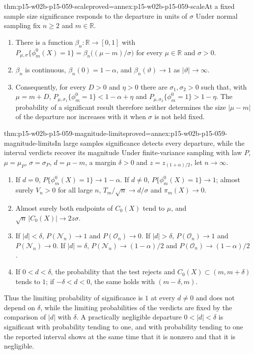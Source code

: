 \begin{hbtheorem}{thm:p15-w02b-p15-059-scale}{proved=annex:p15-w02b-p15-059-scale}{At a fixed sample size significance responds to the departure in units of \(\sigma\)}
Under normal sampling fix \(n\geq2\) and \(m\in\mathbb R\).
\begin{enumerate}
\item There is a function \(\beta_n:\mathbb R\to[0,1]\) with
\(P_{\mu,\sigma}\{\phi_m^0(X)=1\}=\beta_n\bigl((\mu-m)/\sigma\bigr)\) for
every \(\mu\in\mathbb R\) and \(\sigma>0\).
\item \(\beta_n\) is continuous, \(\beta_n(0)=1-\alpha\), and
\(\beta_n(\vartheta)\to1\) as \(|\vartheta|\to\infty\).
\item Consequently, for every \(D>0\) and \(\eta>0\) there are
\(\sigma_1,\sigma_2>0\) such that, with \(\mu=m+D\),
\(P_{\mu,\sigma_1}\{\phi_m^0=1\}<1-\alpha+\eta\) and
\(P_{\mu,\sigma_2}\{\phi_m^0=1\}>1-\eta\). The probability of a
significant result therefore neither determines the size \(|\mu-m|\) of the
departure nor increases with it when \(\sigma\) is not held fixed.
\end{enumerate}
\end{hbtheorem}

\begin{hbtheorem}{thm:p15-w02b-p15-059-magnitude-limits}{proved=annex:p15-w02b-p15-059-magnitude-limits}{In large samples significance detects every departure, while the interval verdicts recover its magnitude}
Under finite-variance sampling with law \(P\), \(\mu=\mu_P\),
\(\sigma=\sigma_P\), \(d=\mu-m\), a margin \(\delta>0\) and
\(z=z_{(1+\alpha)/2}\), let \(n\to\infty\).
\begin{enumerate}
\item If \(d=0\), \(P\{\phi_m^0(X)=1\}\to1-\alpha\). If \(d\neq0\),
\(P\{\phi_m^0(X)=1\}\to1\); almost surely \(V_n>0\) for all large \(n\),
\(T_m/\sqrt n\to d/\sigma\) and \(\pi_m(X)\to0\).
\item Almost surely both endpoints of \(C_0(X)\) tend to \(\mu\), and
\(\sqrt n\,|C_0(X)|\to2z\sigma\).
\item If \(|d|<\delta\), \(P(\mathcal N_n)\to1\) and \(P(\mathcal O_n)\to0\).
If \(|d|>\delta\), \(P(\mathcal O_n)\to1\) and \(P(\mathcal N_n)\to0\). If
\(|d|=\delta\), \(P(\mathcal N_n)\to(1-\alpha)/2\) and
\(P(\mathcal O_n)\to(1-\alpha)/2\).
\item If \(0<d<\delta\), the probability that the test rejects and
\(C_0(X)\subset(m,m+\delta)\) tends to \(1\); if \(-\delta<d<0\), the same
holds with \((m-\delta,m)\).
\end{enumerate}
Thus the limiting probability of significance is \(1\) at every \(d\neq0\)
and does not depend on \(\delta\), while the limiting probabilities of the
verdicts are fixed by the comparison of \(|d|\) with \(\delta\). A
practically negligible departure \(0<|d|<\delta\) is significant with
probability tending to one, and with probability tending to one the
reported interval shows at the same time that it is nonzero and that it is
negligible.
\end{hbtheorem}


